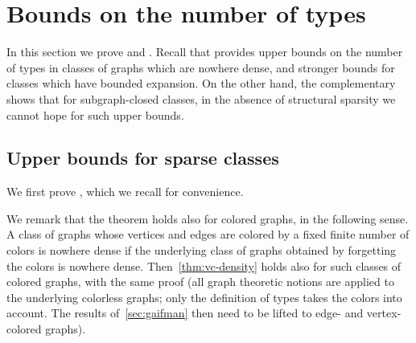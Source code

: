 \section{Bounds on the number of types}\label{sec:types}

In this section we prove  and .
	Recall that  provides upper bounds on the number of types in classes of graphs which are nowhere dense, 
	and stronger bounds for classes which have bounded expansion. 
	On the other hand, the complementary  shows that for subgraph-closed classes, in the absence of structural sparsity we cannot hope for such upper bounds.

\subsection{Upper bounds for sparse classes}
We first prove , which we recall for convenience.

\vcupper*
We remark that the theorem holds also for colored graphs, in the following sense.
A class of graphs  whose vertices and edges are colored by a fixed finite number of colors is nowhere dense if the underlying class of graphs obtained by forgetting the colors is nowhere dense. Then~\cref{thm:vc-density} holds also for such classes of colored graphs, with the same proof (all graph theoretic notions
are applied to the underlying colorless graphs; only the definition of types takes the colors into account. The results of~\cref{sec:gaifman} then need to be lifted to edge- and vertex-colored graphs).

